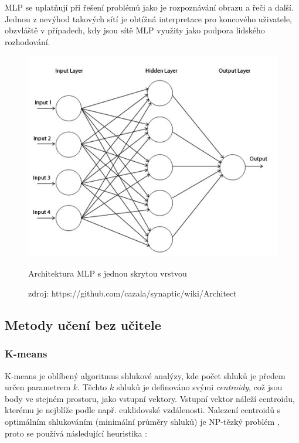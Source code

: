 \documentclass[thesis=M,czech]{FITthesis}[2012/06/26]
\begin{document}
MLP se uplatňují při řešení problémů jako je rozpoznávání obrazu a řeči a další. Jednou z nevýhod takových sítí je obtížná interpretace pro koncového uživatele, obzvláště v případech, kdy jsou sítě MLP využity jako podpora lidského rozhodování. 



\begin{figure}[htbp]
\begin{center}
	\includegraphics[scale=0.4]{mlp.jpeg}
\caption{Architektura MLP s jednou skrytou vrstvou}
\label{fig:mlp}
\end{center}
  \caption*{zdroj: https://github.com/cazala/synaptic/wiki/Architect}
\end{figure}

 
 \subsection{Metody učení bez učitele}

  \subsubsection*{K-means}

K-means je oblíbený algoritmus shlukové analýzy, kde počet shluků je předem určen parametrem $k$. Těchto $k$ shluků je definováno svými \textit{centroidy}, což jsou body ve stejném prostoru, jako vstupní vektory. Vstupní vektor náleží centroidu, kterému je nejblíže podle např. euklidovské vzdálenosti. Nalezení centroidů s optimálním shlukováním (minimální průměry shluků) je NP-tězký problém \cite{k-means-nphard}, proto se  používá následující heuristika \cite{k-means-algo}:
\end{document}
